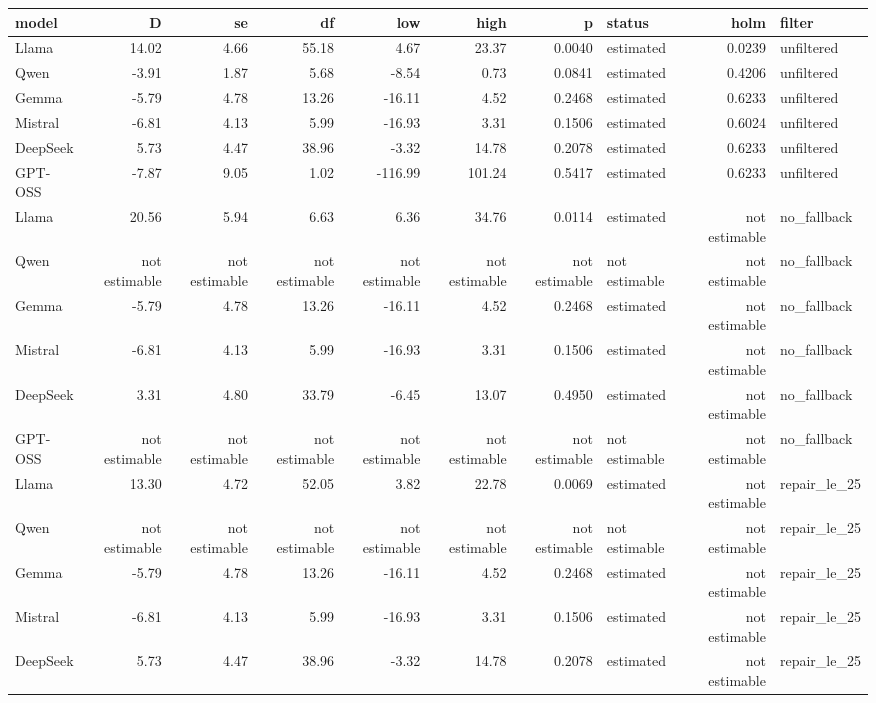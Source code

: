 \begin{tabular}{lrrrrrrlrl}
\toprule
model & D & se & df & low & high & p & status & holm & filter \\
\midrule
Llama & 14.02 & 4.66 & 55.18 & 4.67 & 23.37 & 0.0040 & estimated & 0.0239 & unfiltered \\
Qwen & -3.91 & 1.87 & 5.68 & -8.54 & 0.73 & 0.0841 & estimated & 0.4206 & unfiltered \\
Gemma & -5.79 & 4.78 & 13.26 & -16.11 & 4.52 & 0.2468 & estimated & 0.6233 & unfiltered \\
Mistral & -6.81 & 4.13 & 5.99 & -16.93 & 3.31 & 0.1506 & estimated & 0.6024 & unfiltered \\
DeepSeek & 5.73 & 4.47 & 38.96 & -3.32 & 14.78 & 0.2078 & estimated & 0.6233 & unfiltered \\
GPT-OSS & -7.87 & 9.05 & 1.02 & -116.99 & 101.24 & 0.5417 & estimated & 0.6233 & unfiltered \\
Llama & 20.56 & 5.94 & 6.63 & 6.36 & 34.76 & 0.0114 & estimated & not estimable & no\_fallback \\
Qwen & not estimable & not estimable & not estimable & not estimable & not estimable & not estimable & not estimable & not estimable & no\_fallback \\
Gemma & -5.79 & 4.78 & 13.26 & -16.11 & 4.52 & 0.2468 & estimated & not estimable & no\_fallback \\
Mistral & -6.81 & 4.13 & 5.99 & -16.93 & 3.31 & 0.1506 & estimated & not estimable & no\_fallback \\
DeepSeek & 3.31 & 4.80 & 33.79 & -6.45 & 13.07 & 0.4950 & estimated & not estimable & no\_fallback \\
GPT-OSS & not estimable & not estimable & not estimable & not estimable & not estimable & not estimable & not estimable & not estimable & no\_fallback \\
Llama & 13.30 & 4.72 & 52.05 & 3.82 & 22.78 & 0.0069 & estimated & not estimable & repair\_le\_25 \\
Qwen & not estimable & not estimable & not estimable & not estimable & not estimable & not estimable & not estimable & not estimable & repair\_le\_25 \\
Gemma & -5.79 & 4.78 & 13.26 & -16.11 & 4.52 & 0.2468 & estimated & not estimable & repair\_le\_25 \\
Mistral & -6.81 & 4.13 & 5.99 & -16.93 & 3.31 & 0.1506 & estimated & not estimable & repair\_le\_25 \\
DeepSeek & 5.73 & 4.47 & 38.96 & -3.32 & 14.78 & 0.2078 & estimated & not estimable & repair\_le\_25 \\

\end{tabular}
